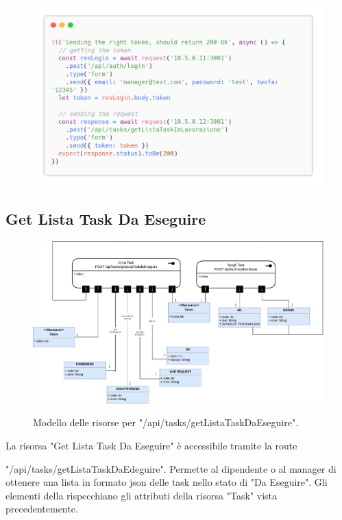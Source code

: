 \documentclass{report}
\begin{document}
\begin{figure}[H]
	\centering\includegraphics[width=1\textwidth]{images/code_in_lavorazione_test4.png}
\end{figure}

\subsection*{Get Lista Task Da Eseguire}

\begin{figure}[H]
	\centering\includegraphics[width=1\textwidth]{images/model_da_eseguire.png}
	
	Modello delle risorse per "/api/tasks/getListaTaskDaEseguire".
\end{figure}

La risorsa "Get Lista Task Da Eseguire" è accessibile tramite la route

"/api/tasks/getListaTaskDaEdeguire". Permette al dipendente o al manager di ottenere una lista in formato json delle task nello stato di "Da Eseguire". Gli elementi della rispecchiano gli attributi della risorsa "Task" vista precedentemente.
\end{document}
